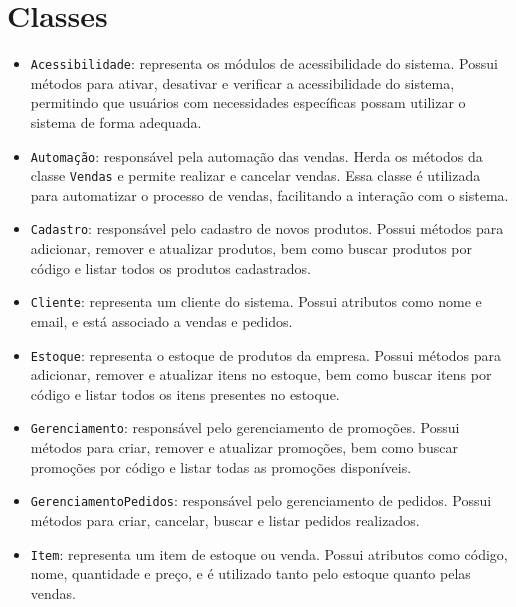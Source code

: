 \documentclass[
	12pt,				%
	openright,			%
	twoside,			%
	a4paper,			%
	english,			%
	brazil				%
	]{abntex2}
\begin{document}
\clearpage

\section{Classes}

\begin{itemize}
    \item \texttt{Acessibilidade}: representa os módulos de acessibilidade do sistema. Possui métodos para ativar, desativar e verificar a acessibilidade do sistema, permitindo que usuários com necessidades específicas possam utilizar o sistema de forma adequada.
    
    \item \texttt{Automação}: responsável pela automação das vendas. Herda os métodos da classe \texttt{Vendas} e permite realizar e cancelar vendas. Essa classe é utilizada para automatizar o processo de vendas, facilitando a interação com o sistema.
    
    \item \texttt{Cadastro}: responsável pelo cadastro de novos produtos. Possui métodos para adicionar, remover e atualizar produtos, bem como buscar produtos por código e listar todos os produtos cadastrados.
    
    \item \texttt{Cliente}: representa um cliente do sistema. Possui atributos como nome e email, e está associado a vendas e pedidos.
    
    \item \texttt{Estoque}: representa o estoque de produtos da empresa. Possui métodos para adicionar, remover e atualizar itens no estoque, bem como buscar itens por código e listar todos os itens presentes no estoque.
    
    \item \texttt{Gerenciamento}: responsável pelo gerenciamento de promoções. Possui métodos para criar, remover e atualizar promoções, bem como buscar promoções por código e listar todas as promoções disponíveis.
    
    \item \texttt{GerenciamentoPedidos}: responsável pelo gerenciamento de pedidos. Possui métodos para criar, cancelar, buscar e listar pedidos realizados.
    
    \item \texttt{Item}: representa um item de estoque ou venda. Possui atributos como código, nome, quantidade e preço, e é utilizado tanto pelo estoque quanto pelas vendas.
    

\end{itemize}
\end{document}
